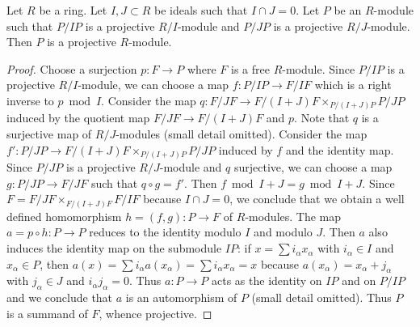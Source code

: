 \begin{lemma}
\label{lemma-projective-modulo-two-ideals}
Let $R$ be a ring. Let $I, J \subset R$ be ideals such that $I \cap J = 0$.
Let $P$ be an $R$-module such that $P/IP$ is a projective $R/I$-module and
$P/JP$ is a projective $R/J$-module. Then $P$ is a projective $R$-module.
\end{lemma}

\begin{proof}
Choose a surjection $p : F \to P$ where $F$ is a free $R$-module.
Since $P/IP$ is a projective $R/I$-module, we can choose a map
$f : P/IP \to F/IF$ which is a right inverse to $p \bmod I$.
Consider the map $q : F/JF \to F/(I + J)F \times_{P/(I + J)P} P/JP$
induced by the quotient map $F/JF \to F/(I + J)F$ and $p$.
Note that $q$ is a surjective map of $R/J$-modules (small detail omitted).
Consider the map $f' : P/JP \to F/(I + J)F \times_{P/(I + J)P} P/JP$
induced by $f$ and the identity map.
Since $P/JP$ is a projective $R/J$-module and $q$ surjective,
we can choose a map $g : P/JP \to F/JF$ such that $q \circ g = f'$.
Then $f \bmod I + J = g \bmod I + J$. Since $F = F/JF \times_{F/(I + J)F} F/IF$
because $I \cap J = 0$, we conclude that we obtain a well defined homomorphism
$h = (f, g) : P \to F$ of $R$-modules. The map $a = p \circ h : P \to P$
reduces to the identity modulo $I$ and modulo $J$. Then $a$ also induces
the identity map on the submodule $IP$: if $x = \sum i_\alpha x_\alpha$
with $i_\alpha \in I$ and $x_\alpha \in P$, then
$a(x) = \sum i_\alpha a(x_\alpha) = \sum i_\alpha x_\alpha = x$
because $a(x_\alpha) = x_\alpha + j_\alpha$ with $j_\alpha \in J$
and $i_\alpha j_\alpha = 0$. Thus $a : P \to P$ acts as the identity
on $IP$ and on $P/IP$ and we conclude that $a$ is an automorphism of $P$
(small detail omitted). Thus $P$ is a summand of $F$, whence projective.
\end{proof}
